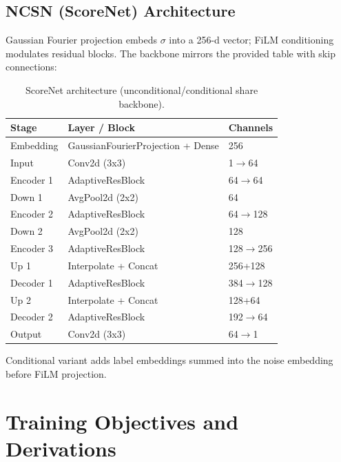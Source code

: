 \documentclass[conference]{IEEEtran}
\begin{document}
\subsection{NCSN (ScoreNet) Architecture}
Gaussian Fourier projection embeds $\sigma$ into a 256-d vector; FiLM conditioning modulates residual blocks. The backbone mirrors the provided table with skip connections:
\begin{table}[H]
\centering
\caption{ScoreNet architecture (unconditional/conditional share backbone).}
\begin{tabular}{lll}
\toprule
Stage & Layer / Block & Channels \\
\midrule
Embedding & GaussianFourierProjection + Dense & 256 \\
Input & Conv2d (3x3) & 1$\rightarrow$64 \\
Encoder 1 & AdaptiveResBlock & 64$\rightarrow$64 \\
Down 1 & AvgPool2d (2x2) & 64 \\
Encoder 2 & AdaptiveResBlock & 64$\rightarrow$128 \\
Down 2 & AvgPool2d (2x2) & 128 \\
Encoder 3 & AdaptiveResBlock & 128$\rightarrow$256 \\
Up 1 & Interpolate + Concat & 256+128 \\
Decoder 1 & AdaptiveResBlock & 384$\rightarrow$128 \\
Up 2 & Interpolate + Concat & 128+64 \\
Decoder 2 & AdaptiveResBlock & 192$\rightarrow$64 \\
Output & Conv2d (3x3) & 64$\rightarrow$1 \\
\bottomrule
\end{tabular}
\end{table}
Conditional variant adds label embeddings summed into the noise embedding before FiLM projection.

\section{Training Objectives and Derivations}
\end{document}
